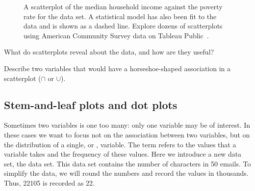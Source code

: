 \begin{figure}[h]
  \centering
{}
  \caption{A scatterplot of the median household income
      against the poverty rate for the
       data set.
      A statistical model has also been fit to the data
      and is shown as a dashed line.  Explore dozens of scatterplots using American Community Survey data on Tableau Public~.}
  \label{medianHHIncomePoverty}
\end{figure}

\begin{exercisewrap}
\begin{nexercise}
What do scatterplots reveal about the data,
and how are they useful?\footnotemark{}
\end{nexercise}
\end{exercisewrap}

\begin{exercisewrap}
\begin{nexercise}
Describe two variables that would have a horseshoe-shaped
association in a scatterplot ($\cap$ or $\cup$).\footnotemark{}
\end{nexercise}
\end{exercisewrap}


\D{\newpage}

\subsection{Stem-and-leaf plots and dot plots}
\label{dotPlot}

Sometimes two variables is one too many: only one variable may be of interest. In these cases we want to focus not on the association between two variables, but on the distribution of a single, or , variable. The term  refers to the values that a variable takes and the frequency of these values. Here we introduce a new data set, the  data set.  This data set contains the number of characters in 50 emails. To simplify the data, we will round the numbers and record the values in thousands. Thus, 22105 is recorded as 22.

